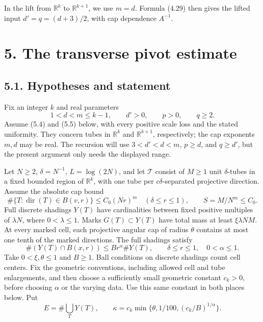 \documentclass[
  11pt,
  a4paper,
]{article}
\begin{document}
In the lift from \(\mathbb R^k\) to \(\mathbb R^{k+1}\), we use \(m=d\).
Formula (4.29) then gives the lifted input \(d'=q=(d+3)/2\), with cap
dependence \(A^{-1}\).

\hypertarget{the-transverse-pivot-estimate}{%
\section{5. The transverse pivot
estimate}\label{the-transverse-pivot-estimate}}

\hypertarget{hypotheses-and-statement}{%
\subsection{5.1. Hypotheses and
statement}\label{hypotheses-and-statement}}

Fix an integer \(k\) and real parameters \[
 1<d<m\le k-1,\qquad d'>0,\qquad p>0,\qquad q\ge2.
\] Assume (5.4) and (5.5) below, with every positive scale loss and the
stated uniformity. They concern tubes in \(\mathbb R^k\) and
\(\mathbb R^{k+1}\), respectively; the cap exponents \(m,d\) may be
real. The recursion will use \(3<d'<d<m\), \(p\ge d\), and \(q\ge d'\),
but the present argument only needs the displayed range.

Let \(N\ge2\), \(\delta=N^{-1}\), \(L=\log(2N)\), and let \(\mathcal T\)
consist of \(M\ge1\) unit \(\delta\)-tubes in a fixed bounded region of
\(\mathbb R^k\), with one tube per \(c\delta\)-separated projective
direction. Assume the absolute cap bound \[
 \#\{T:\operatorname{dir}(T)\in B(v,r)\}
 \le C_0(Nr)^m \quad(\delta\le r\le1),
 \qquad S=M/N^m\le C_0.                           \tag{5.1}\label{eq:5.1}
\] Full discrete shadings \(Y(T)\) have cardinalities between fixed
positive multiples of \(\lambda N\), where \(0<\lambda\le1\). Marks
\(G(T)\subset Y(T)\) have total mass at least \(\xi\lambda NM\). At
every marked cell, each projective angular cap of radius \(\theta\)
contains at most one tenth of the marked directions. The full shadings
satisfy \[
 \#(Y(T)\cap B(x,r))\le B r^\alpha\#Y(T),
 \qquad \delta\le r\le1,\quad 0<\alpha\le1.       \tag{5.2}\label{eq:5.2}
\] Take \(0<\xi,\theta\le1\) and \(B\ge1\). Ball conditions on discrete
shadings count cell centers. Fix the geometric conventions, including
allowed cell and tube enlargements, and then choose a sufficiently small
geometric constant \(c_k>0\), before choosing \(\alpha\) or the varying
data. Use this same constant in both places below. Put \[
 E=\#\bigcup_TY(T),\qquad
 \kappa=c_k\min\{\theta,1/100,(c_k/B)^{1/\alpha}\}.
\]
\end{document}
